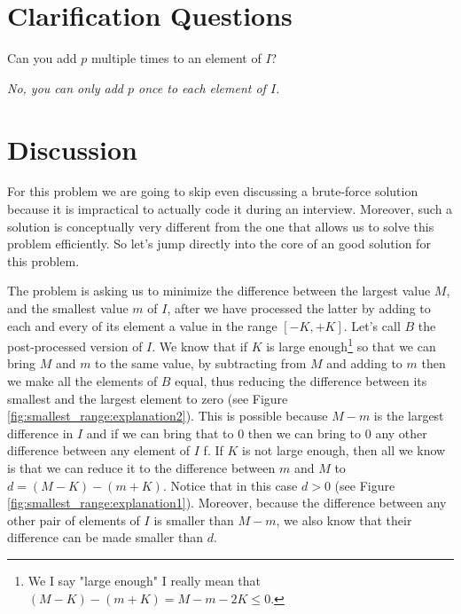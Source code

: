 \section{Clarification Questions}

\begin{QandA}
	\item Can you add $p$ multiple times to an element of $I$?
	\begin{answered}
		\textit{No, you can only add $p$ once to each element of $I$.}
	\end{answered}	
\end{QandA}

\section{Discussion}
\label{smallest_range:sec:discussion}
For this problem we are going to skip even discussing a brute-force solution because it is
impractical to actually code it during an interview. Moreover, such a solution is conceptually very
different from the one that allows us to solve this problem efficiently.
So let's jump directly into the core of an good solution for this problem.

The problem is asking us to minimize the difference between the largest value $M$, and the smallest value $m$ of $I$, after
we have processed the latter by adding to each and every of its element a value in the range $[-K,+K]$.
Let's call $B$ the post-processed version of $I$. 
We know that if $K$ is large enough\footnote{We I say "large enough" I really mean that $(M-K) - (m+K) = M-m-2K \leq 0$.} so that we can bring $M$ and $m$ to the same value, by subtracting from $M$ and adding to $m$
then we make all the elements of $B$ equal, thus reducing the difference between
its smallest and the largest element to zero (see Figure \ref{fig:smallest_range:explanation2}). 
This is possible because $M-m$ is the  largest difference in $I$ and if we can bring that to $0$ then we can bring to $0$ any other difference between any element of $I$  f.
If $K$ is not large enough, then all we know is that we can reduce it to the difference between $m$ and $M$ to $d=(M-K)-(m+K)$. Notice that in this case $d > 0$  (see Figure \ref{fig:smallest_range:explanation1}).
Moreover, because the difference between any other pair of elements of $I$ is smaller than $M-m$, we also know that their difference can be made
smaller than $d$. 



